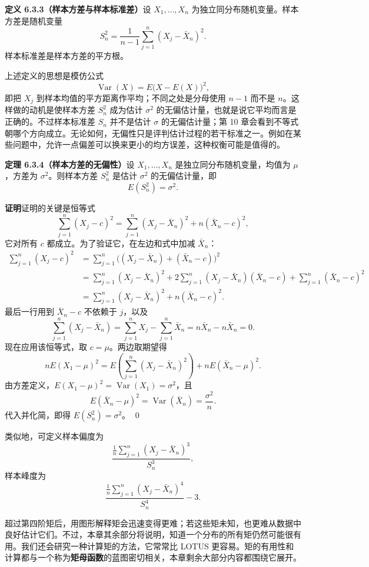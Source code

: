 \documentclass[UTF8,12pt,a4paper,fontset=fandol]{ctexart}
\begin{document}
\noindent\textbf{定义 6.3.3（样本方差与样本标准差）}\quad 设 $X_1,\ldots,X_n$ 为独立同分布随机变量。样本方差是随机变量
\[
  S_n^2=\frac1{n-1}\sum_{j=1}^n(X_j-\bar X_n)^2.
\]
样本标准差是样本方差的平方根。

上述定义的思想是模仿公式
\[
  \operatorname{Var}(X)=E\bigl(X-E(X)\bigr)^2,
\]
即把 $X_j$ 到样本均值的平方距离作平均；不同之处是分母使用 $n-1$ 而不是 $n$。这样做的动机是使样本方差 $S_n^2$ 成为估计 $\sigma^2$ 的无偏估计量，也就是说它平均而言是正确的。不过样本标准差 $S_n$ 并不是估计 $\sigma$ 的无偏估计量；第 10 章会看到不等式朝哪个方向成立。无论如何，无偏性只是评判估计过程的若干标准之一。例如在某些问题中，允许一点偏差可以换来更小的均方误差，这种权衡可能是值得的。

\noindent\textbf{定理 6.3.4（样本方差的无偏性）}\quad 设 $X_1,\ldots,X_n$ 是独立同分布随机变量，均值为 $\mu$，方差为 $\sigma^2$。则样本方差 $S_n^2$ 是估计 $\sigma^2$ 的无偏估计量，即
\[
  E(S_n^2)=\sigma^2.
\]

\noindent\textbf{证明}\quad 证明的关键是恒等式
\[
  \sum_{j=1}^n(X_j-c)^2
  =
  \sum_{j=1}^n(X_j-\bar X_n)^2+n(\bar X_n-c)^2,
\]
它对所有 $c$ 都成立。为了验证它，在左边和式中加减 $\bar X_n$：
\begin{align*}
  \sum_{j=1}^n(X_j-c)^2
  &=
  \sum_{j=1}^n\bigl((X_j-\bar X_n)+(\bar X_n-c)\bigr)^2\\
  &=
  \sum_{j=1}^n(X_j-\bar X_n)^2
  +2\sum_{j=1}^n(X_j-\bar X_n)(\bar X_n-c)
  +\sum_{j=1}^n(\bar X_n-c)^2\\
  &=
  \sum_{j=1}^n(X_j-\bar X_n)^2+n(\bar X_n-c)^2.
\end{align*}
最后一行用到 $\bar X_n-c$ 不依赖于 $j$，以及
\[
  \sum_{j=1}^n(X_j-\bar X_n)
  =
  \sum_{j=1}^nX_j-\sum_{j=1}^n\bar X_n
  =
  n\bar X_n-n\bar X_n=0.
\]
现在应用该恒等式，取 $c=\mu$。两边取期望得
\[
  nE(X_1-\mu)^2
  =
  E\left(\sum_{j=1}^n(X_j-\bar X_n)^2\right)
  +nE(\bar X_n-\mu)^2.
\]
由方差定义，$E(X_1-\mu)^2=\operatorname{Var}(X_1)=\sigma^2$，且
\[
  E(\bar X_n-\mu)^2=\operatorname{Var}(\bar X_n)=\frac{\sigma^2}{n}.
\]
代入并化简，即得 $E(S_n^2)=\sigma^2$。
\qed

类似地，可定义样本偏度为
\[
  \frac{\frac1n\sum_{j=1}^n(X_j-\bar X_n)^3}{S_n^3},
\]
样本峰度为
\[
  \frac{\frac1n\sum_{j=1}^n(X_j-\bar X_n)^4}{S_n^4}-3.
\]

超过第四阶矩后，用图形解释矩会迅速变得更难；若这些矩未知，也更难从数据中良好估计它们。不过，本章其余部分将说明，知道一个分布的所有矩仍然可能很有用。我们还会研究一种计算矩的方法，它常常比 LOTUS 更容易。矩的有用性和计算都与一个称为\textbf{矩母函数}的蓝图密切相关，本章剩余大部分内容都围绕它展开。
\end{document}
